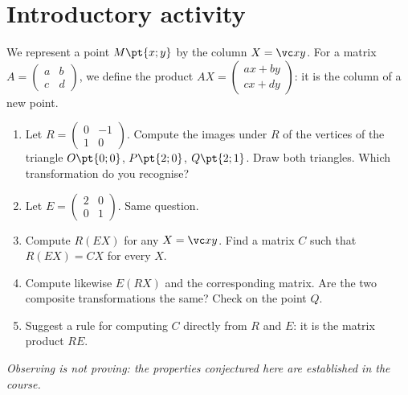 \mxnewpage
\section{Introductory activity}
\begin{activity}
We represent a point $M\pt{x;y}$ by the column $X=\vc xy$. For a matrix $A=\begin{pmatrix}a&b\\c&d\end{pmatrix}$, we define the product $AX=\begin{pmatrix}ax+by\\cx+dy\end{pmatrix}$: it is the column of a new point.
\begin{enumerate}
\item Let $R=\begin{pmatrix}0&-1\\1&0\end{pmatrix}$. Compute the images under $R$ of the vertices of the triangle $O\pt{0;0}$, $P\pt{2;0}$, $Q\pt{2;1}$. Draw both triangles. Which transformation do you recognise?
\item Let $E=\begin{pmatrix}2&0\\0&1\end{pmatrix}$. Same question.
\item Compute $R(EX)$ for any $X=\vc xy$. Find a matrix $C$ such that $R(EX)=CX$ for every $X$.
\item Compute likewise $E(RX)$ and the corresponding matrix. Are the two composite transformations the same? Check on the point $Q$.
\item Suggest a rule for computing $C$ directly from $R$ and $E$: it is the matrix product $RE$.
\end{enumerate}
\par\emph{Observing is not proving: the properties conjectured here are established in the course.}
\end{activity}
